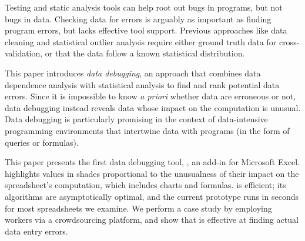 Testing and static analysis tools can help root out bugs in programs,
but not bugs in data. Checking data for errors is arguably as
important as finding program errors, but lacks effective tool
support. Previous approaches like data cleaning and statistical
outlier analysis require either ground truth data for
cross-validation, or that the data follow a known statistical
distribution.

This paper introduces \emph{data debugging}, an approach that combines
data dependence analysis with statistical analysis to find and rank
potential data errors. Since it is impossible to know \emph{a priori}
whether data are erroneous or not, data debugging instead
reveals data whose impact on the computation is unusual.
Data debugging is particularly promising in the context of
data-intensive programming environments that intertwine data with
programs (in the form of queries or formulas).

This paper presents the first data debugging tool, \checkcell{}, an
add-in for Microsoft Excel. \checkcell{} highlights values in shades
proportional to the unusualness of their impact on the spreadsheet's
computation, which includes charts and formulas. \checkcell{} is efficient;
its algorithms are asymptotically optimal, and the current prototype
runs in seconds for most spreadsheets we examine. We perform a case
study by employing workers via a crowdsourcing platform, and show
that \checkcell{} is effective at finding actual data entry errors.

